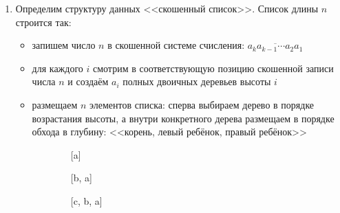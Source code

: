 \begin{enumerate}
  \item
    Определим структуру данных <<скошенный список>>. Список длины $n$ строится так:
    \begin{itemize}
		\item запишем число $n$ в скошенной системе счисления: $\overline{a_k a_{k-1} \cdots a_2 a_1}$
		\item для каждого $i$ смотрим в соответствующую позицию скошенной записи числа $n$ и создаём $a_i$ полных двоичных деревьев высоты $i$
		\item размещаем $n$ элементов списка: сперва выбираем дерево в порядке возрастания высоты, а внутри конкретного дерева размещаем в порядке обхода в глубину: <<корень, левый ребёнок, правый ребёнок>>
	\end{itemize}

    \begin{figure}[H]
      \captionsetup[subfigure]{labelformat=empty}
      \centering
      \begin{subfigure}[b]{0.2\textwidth}
        \centering
        \caption{[a]}
      \end{subfigure}
      \hfill
      \begin{subfigure}[b]{0.2\textwidth}
        \centering
        \caption{[b, a]}
      \end{subfigure}
      \hfill
      \begin{subfigure}[b]{0.2\textwidth}
        \centering
        \caption{[c, b, a]}
      \end{subfigure}
      \hfill
      \begin{subfigure}[b]{0.2\textwidth}
        \centering
\end{subfigure}
\end{figure}
\end{enumerate}
